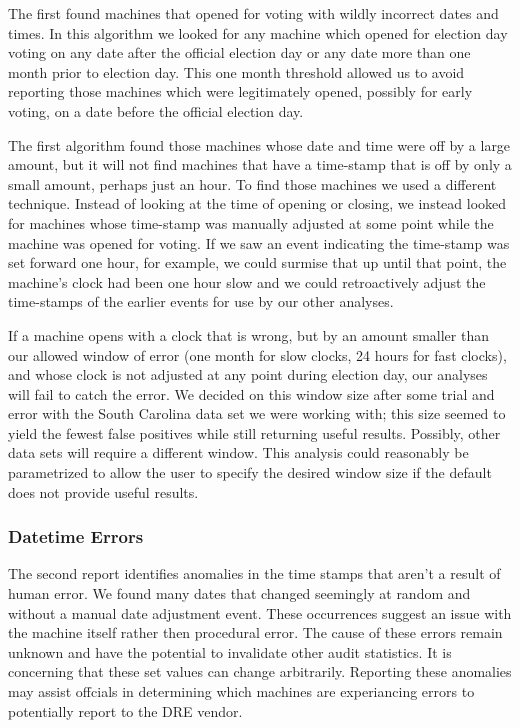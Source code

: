 The first found machines that opened for voting with wildly incorrect
dates and times. In this algorithm we looked for any machine which
opened for election day voting on any date after the official election
day or any date more than one month prior to election day. This one
month threshold allowed us to avoid reporting those machines which
were legitimately opened, possibly for early voting, on a date before
the official election day. 

The first algorithm found those machines whose date and time were
off by a large amount, but it will not find machines that have a
time-stamp that is off by only a small amount, perhaps just an
hour. To find those machines we used a different technique. Instead of
looking at the time of opening or closing, we instead looked for
machines whose time-stamp was manually adjusted at some point while
the machine was opened for voting. If we saw an event indicating the
time-stamp was set forward one hour, for example, we could surmise that
up until that point, the machine's clock had been one hour slow and we
could retroactively adjust the time-stamps of the earlier events for
use by our other analyses.

If a machine opens with a clock that is wrong, but by an amount
smaller than our allowed window of error (one month for slow clocks,
24 hours for fast clocks), and whose clock is not adjusted at any
point during election day, our analyses will fail to catch the
error. We decided on this window size after some trial and error with
the South Carolina data set we were working with; this size seemed to
yield the fewest false positives while still returning useful
results. Possibly, other data sets will require a different
window. This analysis could reasonably be parametrized to
allow the user to specify the desired window size if the default does
not provide useful results.

\subsubsection{Datetime Errors}
The second report identifies anomalies in the time stamps that aren't a result
of human error. We found many dates that changed seemingly at random and without
a manual date adjustment event. These occurrences suggest an issue with the
machine itself rather then procedural error. The cause of these errors remain
unknown and have the potential to invalidate other audit statistics. It is
concerning that these set values can change arbitrarily. Reporting these
anomalies may assist offcials in determining which machines are experiancing
errors to potentially report to the DRE vendor.

